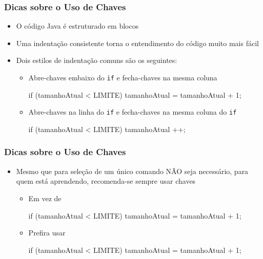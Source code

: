 \documentclass[xcolor={dvipsnames,table},aspectratio=169]{beamer}
\begin{document}
\begin{frame}[fragile]\frametitle{Dicas sobre o Uso de Chaves}
\begin{itemize}
	\item O código Java é estruturado em blocos
	\item Uma indentação consistente torna o entendimento do código muito mais fácil
	\item Dois estilos de indentação comuns são os seguintes:
	\begin{itemize}
		\item Abre-chaves embaixo do \texttt{if} e fecha-chaves na mesma coluna
\begin{javacode}
if (tamanhoAtual < LIMITE)
{
   tamanhoAtual = tamanhoAtual + 1;
}
\end{javacode}
		\item Abre-chaves na linha do \texttt{if} e fecha-chaves na mesma coluna do \texttt{if}
\begin{javacode}
if (tamanhoAtual < LIMITE) {
   tamanhoAtual ++;
}
\end{javacode}
	\end{itemize}
\end{itemize}
\end{frame}

\begin{frame}[fragile]\frametitle{Dicas sobre o Uso de Chaves}
\begin{itemize}
	\item Mesmo que para seleção de um único comando NÃO seja necessário, para quem está aprendendo, recomenda-se sempre usar chaves
	\begin{itemize}
		\item Em vez de
\begin{javacode}
if (tamanhoAtual < LIMITE)
   tamanhoAtual = tamanhoAtual + 1;
\end{javacode}
		\item Prefira usar
\begin{javacode}
if (tamanhoAtual < LIMITE) {
   tamanhoAtual = tamanhoAtual + 1;
}
\end{javacode}
	\end{itemize}
\end{itemize}
\end{frame}
\end{document}
